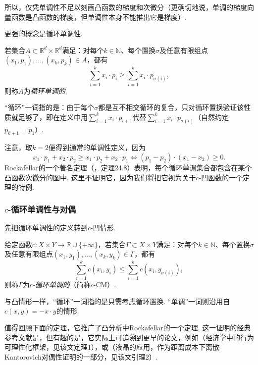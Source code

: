 所以，仅凭单调性不足以刻画凸函数的梯度和次微分（更确切地说，单调的梯度向量函数是凸函数的梯度，但单调性本身不能推出它是梯度）.

更强的概念是循环单调性.

\begin{definition}\label{obj:1.35}
若集合$A\subset\mathbb R^d\times\mathbb R^d$满足：对每个$k\in\mathbb N$、每个置换$\sigma$及任意有限组点$(x_1,p_1),\ldots,(x_k,p_k)\in A$，都有
\[
\sum_{i=1}^k x_i\cdot p_i\ge\sum_{i=1}^k x_i\cdot p_{\sigma(i)},
\]
则称$A$为\emph{循环单调的}.
\end{definition}

“循环”一词指的是：由于每个$\sigma$都是互不相交循环的复合，只对循环置换验证该性质就足够了，即在定义中用$\sum_{i=1}^k x_i\cdot p_{i+1}$代替$\sum_{i=1}^k x_i\cdot p_{\sigma(i)}$（自然约定$p_{k+1}=p_1$）.

注意，取$k=2$便得到通常的单调性定义，因为
\[
x_1\cdot p_1+x_2\cdot p_2\ge x_1\cdot p_2+x_2\cdot p_1
\iff(p_1-p_2)\cdot(x_1-x_2)\ge0.
\]
Rockafellar的一个著名定理（\cite{b260}，定理24.8）表明，每个循环单调集合都包含在某个凸函数次微分的图中. 这里不证明它，因为我们将把它视为关于$c$-凹函数的一个定理的特例.

\subsubsection[c-循环单调性与对偶]{$c$-循环单调性与对偶}\label{sec:1.6.2}

先把循环单调性的定义转到$c$-凹情形.

\begin{definition}\label{obj:1.36}
给定函数$c:X\times Y\to\mathbb R\cup\{+\infty\}$，若集合$\Gamma\subset X\times Y$满足：对每个$k\in\mathbb N$、每个置换$\sigma$及任意有限组点$(x_1,y_1),\ldots,(x_k,y_k)\in\Gamma$，都有
\[
\sum_{i=1}^k c(x_i,y_i)\le\sum_{i=1}^k c(x_i,y_{\sigma(i)}),
\]
则称$\Gamma$为\emph{$c$-循环单调的}（简称$c$-CM）.
\end{definition}

与凸情形一样，“循环”一词指的是只需考虑循环置换. “单调”一词则沿用自$c(x,y)=-x\cdot y$的情形.

值得回顾下面的定理，它推广了凸分析中Rockafellar的一个定理. 这一证明的经典参考文献是\cite{b269}，但有趣的是，它实际上可追溯到更早的论文，例如\cite{b261}（经济学中的行为可理性化框架，见该文定理1），或\cite{b91}（液晶的应用，作为距离成本下离散Kantorovich对偶性证明的一部分，见该文引理2）.

